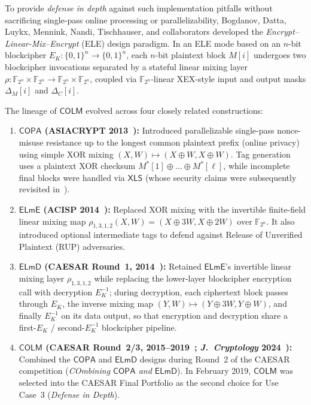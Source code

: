 \documentclass[11pt,a4paper]{article}
\theoremstyle{definition}
\theoremstyle{remark}
\newcommand{\Ftwon}{\mathbb{F}_{2^n}}
\newcommand{\COLM}{\mathsf{COLM}}
\newcommand{\COPA}{\mathsf{COPA}}
\newcommand{\ELmE}{\mathsf{ELmE}}
\newcommand{\ELmD}{\mathsf{ELmD}}
\begin{document}
To provide \emph{defense in depth} against such implementation pitfalls without sacrificing single-pass online processing or parallelizability, Bogdanov, Datta, Luykx, Mennink, Nandi, Tischhauser, and collaborators developed the \emph{Encrypt--Linear-Mix--Encrypt} (ELE) design paradigm. In an ELE mode based on an $n$-bit blockcipher $E_K : \{0,1\}^n \to \{0,1\}^n$, each $n$-bit plaintext block $M[i]$ undergoes two blockcipher invocations separated by a stateful linear mixing layer $\rho : \Ftwon \times \Ftwon \to \Ftwon \times \Ftwon$, coupled via $\Ftwon$-linear XEX-style input and output masks $\Delta_M[i]$ and $\Delta_C[i]$.

The lineage of $\COLM$ evolved across four closely related constructions:
\begin{enumerate}[leftmargin=2em]
    \item \textbf{$\COPA$ (ASIACRYPT 2013~\cite{ABLMTY13}):} Introduced parallelizable single-pass nonce-misuse resistance up to the longest common plaintext prefix (online privacy) using simple XOR mixing $(X, W) \mapsto (X \oplus W, X \oplus W)$. Tag generation uses a plaintext XOR checksum $M^*[1] \oplus \dots \oplus M^*[\ell]$, while incomplete final blocks were handled via $\mathsf{XLS}$ (whose security claims were subsequently revisited in~\cite{Nandi15}).
    \item \textbf{$\ELmE$ (ACISP 2014~\cite{DN14}):} Replaced XOR mixing with the invertible finite-field linear mixing map $\rho_{1,3,1,2}(X, W) = (X \oplus 3W, X \oplus 2W)$ over $\Ftwon$. It also introduced optional intermediate tags to defend against Release of Unverified Plaintext (RUP) adversaries.
    \item \textbf{$\ELmD$ (CAESAR Round~1, 2014~\cite{DN14b}):} Retained $\ELmE$'s invertible linear mixing layer $\rho_{1,3,1,2}$ while replacing the lower-layer blockcipher encryption call with decryption $E_K^{-1}$; during decryption, each ciphertext block passes through $E_K$, the inverse mixing map $(Y, W) \mapsto (Y \oplus 3W, Y \oplus W)$, and finally $E_K^{-1}$ on its data output, so that encryption and decryption share a first-$E_K$ / second-$E_K^{-1}$ blockcipher pipeline.
    \item \textbf{$\COLM$ (CAESAR Round~2/3, 2015--2019~\cite{COLMv1,COLMadd}; \emph{J.~Cryptology} 2024~\cite{COLM24}):} Combined the $\COPA$ and $\ELmD$ designs during Round~2 of the CAESAR competition (\emph{COmbining $\COPA$ and $\ELmD$}). In February 2019, $\COLM$ was selected into the CAESAR Final Portfolio as the second choice for Use Case~3 (\emph{Defense in Depth}).
\end{enumerate}
\end{document}
